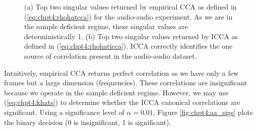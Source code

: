 \begin{figure}
  \begin{center}
    \caption{(a) Top two singular values returned by empirical CCA as defined in
      (\ref{eq:chpt4:rhohatcca}) for the audio-audio experiment. As we are in the sample
      deficient regime, these singular values are deterministically 1. (b) Top two
      singular values returned by ICCA as defined in (\ref{eq:chpt4:rhohaticca}). ICCA
      correctly identifies the one source of correlation present in the audio-audio
      dataset.}
    \label{fig:chpt4:aa_corrs}
  \end{center}
\end{figure}

Intuitively, empirical CCA returns perfect correlation as we have only a few frames but a large
dimension (frequencies). These correlations are insignificant because we operate in the
sample deficient regime. However, we may use (\ref{eq:chpt4:khats}) to determine whether the
ICCA canonical correlations are significant. Using a significance level of $\alpha=0.01$,
Figure \ref{fig:chpt4:aa_sigs} plots the binary decision (0 is insignificant, 1 is significant). 

